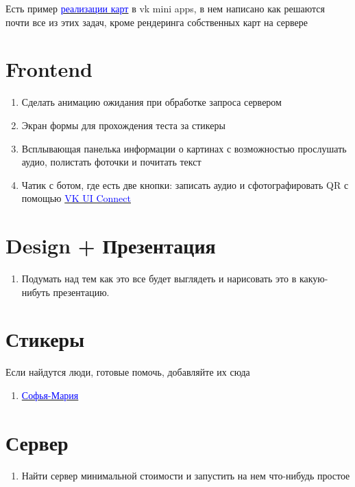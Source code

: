 \documentclass[11pt]{article}
\begin{document}
Есть пример \href{https://vk.com/@clefer-vkapps-api}{\textcolor{blue}{реализации карт}} в vk mini apps, в нем написано как решаются почти все из этих задач, кроме рендеринга собственных карт на сервере

\section{Frontend}
\begin{enumerate}
\item Сделать анимацию ожидания при обработке запроса сервером 

\item  Экран формы для прохождения теста за стикеры

\item Всплывающая панелька информации о картинах с возможностью прослушать аудио, полистать фоточки и почитать текст

\item Чатик с ботом, где есть две кнопки:  записать аудио и сфотографировать QR с помощью  \href{https://vk.com/dev/vk_apps_docs}{\textcolor{blue}{VK UI Connect}}
\end{enumerate}
\section{Design + Презентация}
\begin{enumerate}

\item  Подумать над тем как это все будет выглядеть и нарисовать это в какую-нибуть презентацию.


\end{enumerate}
\section{Стикеры}

Если найдутся люди, готовые помочь,  добавляйте их сюда
\begin{enumerate}

\item \href{https://vk.com/sofiamarid_art}{\textcolor{blue}{Софья-Мария}}

\end{enumerate}
\section{Сервер}

\begin{enumerate}

\item Найти сервер минимальной стоимости и запустить на нем что-нибудь простое 

\end{enumerate}
\end{document}
